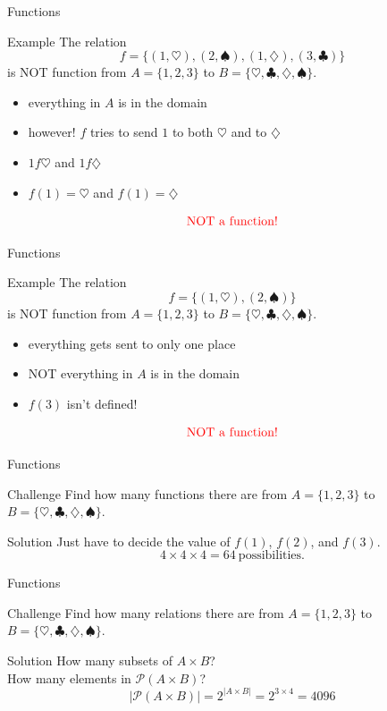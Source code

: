 \documentclass{beamer}
\begin{document}
\begin{frame}{Functions}
\begin{block}{Example}
The relation
$$f = \{(1,\heartsuit),(2,\spadesuit),(1,\diamondsuit),(3,\clubsuit)\}$$
is NOT function from $A = \{1,2,3\}$ to $B = \{\heartsuit,\clubsuit,\diamondsuit,\spadesuit\}$.
\begin{itemize}
\pause
\item everything in $A$ is in the domain
\pause
\item however! $f$ tries to send $1$ to both $\heartsuit$ and to $\diamondsuit$
\pause
\item $1f\heartsuit$ and $1f\diamondsuit$
\pause
\item $f(1) = \heartsuit$ and $f(1) =\diamondsuit$
\end{itemize}
\pause
$$\text{{\color{red}NOT a function!}}$$
\end{block}
\end{frame}

\begin{frame}{Functions}
\begin{block}{Example}
The relation
$$f = \{(1,\heartsuit),(2,\spadesuit)\}$$
is NOT function from $A = \{1,2,3\}$ to $B = \{\heartsuit,\clubsuit,\diamondsuit,\spadesuit\}$.
\begin{itemize}
\pause
\item everything gets sent to only one place
\pause
\item NOT everything in $A$ is in the domain
\pause
\item $f(3)$ isn't defined!
\end{itemize}
\pause
$$\text{{\color{red}NOT a function!}}$$
\end{block}
\end{frame}

\begin{frame}{Functions}
\begin{block}{Challenge}
Find how many functions there are from
$A = \{1,2,3\}$ to $B = \{\heartsuit,\clubsuit,\diamondsuit,\spadesuit\}$.
\end{block}
\pause
\begin{block}{Solution}
\pause
Just have to decide the value of $f(1)$, $f(2)$, and $f(3)$.
\pause
$$4\times 4\times 4 = 64\ \text{possibilities}.$$
\end{block}
\end{frame}

\begin{frame}{Functions}
\begin{block}{Challenge}
Find how many relations there are from
$A = \{1,2,3\}$ to $B = \{\heartsuit,\clubsuit,\diamondsuit,\spadesuit\}$.
\end{block}
\pause
\begin{block}{Solution}
\pause
How many subsets of $A\times B$?\\
\pause
How many elements in $\mathcal P(A\times B)$?\\
\pause
$$|\mathcal P(A\times B)| = 2^{|A\times B|} = 2^{3\times 4} = 4096$$
\end{block}
\end{frame}
\end{document}
